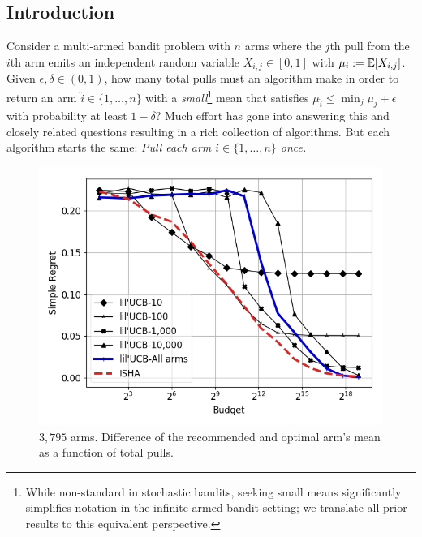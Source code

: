 
\subsection{Introduction}\label{intro}
Consider a multi-armed bandit problem with $n$ arms where the $j$th pull from the $i$th arm emits an independent random variable $X_{i,j} \in [0,1]$ with $\mu_i:=\mathbb{E}[X_{i,j}]$. 
Given $\epsilon,\delta \in (0,1)$, how many total pulls must an algorithm make in order to return an arm $\widehat{i} \in \{1,\dots,n\}$ with a \emph{small}\footnote{While non-standard in stochastic bandits, seeking small means significantly simplifies notation in the infinite-armed bandit setting; we translate all prior results to this equivalent perspective.} mean that satisfies $\mu_{\widehat{i}} \leq \displaystyle\min_{j} \mu_j + \epsilon$ with probability at least $1-\delta$?
Much effort has gone into answering this and closely related questions resulting in a rich collection of algorithms.
But each algorithm starts the same:  \textit{Pull each arm $i \in \{1,\dots,n\}$ once.}

%
%
\begin{figure}
\includegraphics[width=.45\textwidth]{fixedbudget/figures/folder5/new_yorker.png}
\caption{$3,795$ arms. Difference of the recommended and optimal arm's mean as a function of total pulls. }
\label{fig:newyorker}
\vspace{-1.5em}
\end{figure}
%
%


